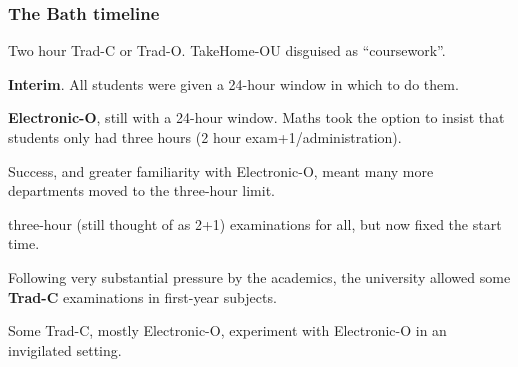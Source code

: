 \begin{frame}[fragile]
\frametitle{The Bath timeline}
\pause
\begin{description}[<+->]
\item[Prior]Two hour Trad-C or Trad-O. TakeHome-OU disguised as ``coursework''.
\item[May 2020]{\bf Interim}. %
All students were given a 24-hour window in which to do them. 
\item[January 2021]{\bf Electronic-O},
still with a 24-hour window.  Maths took the option to insist that students only had three hours (2 hour exam+1/administration).
\item[May 2021] 
Success, and greater familiarity with Electronic-O, meant
many more departments moved to the three-hour limit.
\item[January 2022] 
three-hour (still thought of as 2+1) examinations for all, but now fixed the start time.
\item[May 2022] Following very substantial pressure by the academics, the university allowed some {\bf Trad-C} examinations in first-year subjects.
\item[Future]Some Trad-C, mostly Electronic-O, experiment with Electronic-O in an invigilated setting.
\end{description}
\end{frame}
